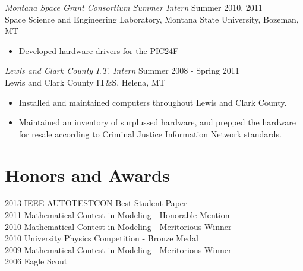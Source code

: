 \documentclass[line,margin]{res}
\begin{document}
\begin{resume}
\begin{itemize}
                \end{itemize}
 
                {\sl Montana Space Grant Consortium Summer Intern} \hfill            Summer 2010, 2011 \\
                Space Science and Engineering Laboratory,
                Montana State University, Bozeman, MT
                 \begin{itemize}  \itemsep -2pt %
                 \item  Developed hardware drivers for the PIC24F
                 \end{itemize} 
                 
                {\sl Lewis and Clark County I.T. Intern} \hfill        Summer 2008 - Spring 2011 \\
                Lewis and Clark County IT{\&}S,
				Helena, MT
                  \begin{itemize}
                   \item Installed and maintained computers throughout Lewis and Clark County.
                   \item Maintained an inventory of surplussed hardware, and prepped the hardware for resale according to Criminal Justice Information Network standards.
                   \end{itemize} 



\section{Honors and Awards}           
			2013 IEEE AUTOTESTCON Best Student Paper \\  
			2011 Mathematical Contest in Modeling - Honorable Mention \\
            2010 Mathematical Contest in Modeling - Meritorious Winner \\
            2010 University Physics Competition - Bronze Medal \\
			2009 Mathematical Contest in Modeling - Meritorious Winner \\
            2006 Eagle Scout
            

\end{resume}
\end{document}
